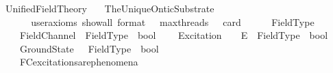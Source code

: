 %
\begin{isabellebody}%
%
%
\isadelimtheory
%
\endisadelimtheory
%
\isatagtheory
{}\isamarkupfalse%
\ Unified{\isacharunderscore}{\kern0pt}Field{\isacharunderscore}{\kern0pt}Theory\isanewline
\ \ \ The{\isacharunderscore}{\kern0pt}Unique{\isacharunderscore}{\kern0pt}Ontic{\isacharunderscore}{\kern0pt}Substrate\isanewline
{}%
\endisatagtheory
{\isafoldtheory}%
%
\isadelimtheory
\isanewline
%
\endisadelimtheory
\ \ \isanewline
\ \ \isanewline
\ \ \isanewline
\ \ \isanewline
\ \ \isanewline
\ \ \isanewline
\ \ \isanewline
\ \ \isanewline
\ \ \isanewline
\ \ \isanewline
\isanewline
\ \ \isanewline
\ \ \isamarkupfalse%
\ {\isacharbrackleft}{\kern0pt}user{\isacharunderscore}{\kern0pt}axioms{\isacharcomma}{\kern0pt}\ show{\isacharunderscore}{\kern0pt}all{\isacharcomma}{\kern0pt}\ format\ {\isacharequal}{\kern0pt}\ {}{\isacharcomma}{\kern0pt}\ max{\isacharunderscore}{\kern0pt}threads\ {\isacharequal}{\kern0pt}\ {}{\isacharcomma}{\kern0pt}\ card\ {\isacharequal}{\kern0pt}\ {}{\isacharcomma}{\kern0pt}{}{\isacharcomma}{\kern0pt}{}{\isacharcomma}{\kern0pt}{}{\isacharcomma}{\kern0pt}{}{\isacharbrackright}{\kern0pt}%
\isadelimdocument
%
\endisadelimdocument
%
\isatagdocument
%
\isamarkuptrue%
%
\endisatagdocument
{\isafolddocument}%
%
\isadelimdocument
%
\endisadelimdocument
\ \ \isamarkupfalse%
\ FieldType\ \ \ \isanewline
\isanewline
\ \ \isamarkupfalse%
\isanewline
\ \ \ \ FieldChannel\ {\isacharcolon}{\kern0pt}{\isacharcolon}{\kern0pt}\ {\isachardoublequoteopen}FieldType\ {\isasymRightarrow}\ bool{\isachardoublequoteclose}\isanewline
\ \ \ \ Excitation\ \ \ {\isacharcolon}{\kern0pt}{\isacharcolon}{\kern0pt}\ {\isachardoublequoteopen}E\ {\isasymRightarrow}\ FieldType\ {\isasymRightarrow}\ bool{\isachardoublequoteclose}\ \ \isanewline
\ \ \ \ GroundState\ \ {\isacharcolon}{\kern0pt}{\isacharcolon}{\kern0pt}\ {\isachardoublequoteopen}FieldType\ {\isasymRightarrow}\ bool{\isachardoublequoteclose}\ \ \ \ \ \ \ \ \ \ \ \ \isanewline
\isanewline
\ \ \isamarkupfalse%
\ \isanewline
\ \ \ \ FC{}{\isacharunderscore}{\kern0pt}excitations{\isacharunderscore}{\kern0pt}are{\isacharunderscore}{\kern0pt}phenomena{\isacharcolon}{\kern0pt}\isanewline

\end{isabellebody}
